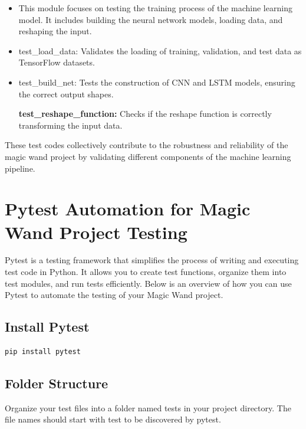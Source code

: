 			\begin{itemize}
				
				\item This module focuses on testing the training process of the machine learning model. It includes building the neural network models, loading data, and reshaping the input.
				
				\item test\_load\_data: Validates the loading of training, validation, and test data as TensorFlow datasets.
				
				\item test\_build\_net: Tests the construction of CNN and LSTM models, ensuring the correct output shapes.
				
				\textbf{test\_reshape\_function:} Checks if the reshape function is correctly transforming the input data.
				
			\end{itemize}
			
			These test codes collectively contribute to the robustness and reliability of the magic wand project by validating different components of the machine learning pipeline.
		
		\section{Pytest Automation for Magic Wand Project Testing}
		
			Pytest is a testing framework that simplifies the process of writing and executing test code in Python. It allows you to create test functions, organize them into test modules, and run tests efficiently. Below is an overview of how you can use Pytest to automate the testing of your Magic Wand project.
			
			\subsection{Install Pytest}
			\begin{lstlisting}[language=Python, caption={Installing Pytest Using pip}, label={code:install-pytest}, style=pythonstyle]
				pip install pytest
			\end{lstlisting}
			
		
			\subsection{Folder Structure}
			
			Organize your test files into a folder named tests in your project directory. The file names should start with test to be discovered by pytest.
		
